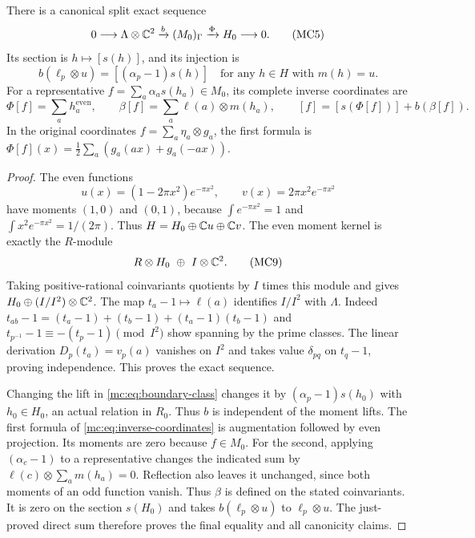 \begin{theorem}
\label{mc:thm:coinvariants}
There is a canonical split exact sequence
\[
 0\longrightarrow\Lambda\otimes\mathbb C^2
 \xrightarrow{b}(M_0)_\Gamma
 \xrightarrow{\Phi}H_0\longrightarrow0.
 \tag{MC5}\label{mc:eq:coinvariant-sequence}
\]
Its section is $h\mapsto[s(h)]$, and its injection is
\[
 b(\ell_p\otimes u)=[(\alpha_p-1)s(h)]
 \quad\text{for any }h\in H\text{ with }m(h)=u.
 \tag{MC6}\label{mc:eq:boundary-class}
\]
For a representative $f=\sum_a\alpha_as(h_a)\in M_0$, its
complete inverse coordinates are
\[
 \Phi[f]=\sum_a h_a^{\mathrm{even}},\qquad
 \beta[f]=\sum_a\ell(a)\otimes m(h_a),
 \qquad
 [f]=[s(\Phi[f])]+b(\beta[f]).
 \tag{MC7}\label{mc:eq:inverse-coordinates}
\]
In the original coordinates $f=\sum_a\eta_a\otimes g_a$,
the first formula is
$\Phi[f](x)=\tfrac12\sum_a(g_a(ax)+g_a(-ax))$.
\end{theorem}
\begin{proof}
The even functions
\[
 u(x)=(1-2\pi x^2)e^{-\pi x^2},\qquad
 v(x)=2\pi x^2e^{-\pi x^2}
 \tag{MC8}\label{mc:eq:moment-lifts}
\]
have moments $(1,0)$ and $(0,1)$, because
$\int e^{-\pi x^2}=1$ and $\int x^2e^{-\pi x^2}=1/(2\pi)$.
Thus $H=H_0\oplus\mathbb C u\oplus\mathbb C v$. The even moment kernel is
exactly the $R$-module
\[
 R\otimes H_0\ \oplus\ I\otimes\mathbb C^2.
 \tag{MC9}\label{mc:eq:moment-module}
\]
Taking positive-rational coinvariants quotients by $I$ times this
module and gives $H_0\oplus(I/I^2)\otimes\mathbb C^2$.
The map $t_a-1\mapsto\ell(a)$ identifies $I/I^2$ with
$\Lambda$. Indeed
$t_{ab}-1=(t_a-1)+(t_b-1)+(t_a-1)(t_b-1)$ and
$t_{p^{-1}}-1\equiv-(t_p-1)\pmod{I^2}$ show spanning by
the prime classes. The linear derivation $D_p(t_a)=v_p(a)$
vanishes on $I^2$ and takes value $\delta_{pq}$ on $t_q-1$,
proving independence. This proves the exact sequence.

Changing the lift in \eqref{mc:eq:boundary-class} changes it by
$(\alpha_p-1)s(h_0)$ with $h_0\in H_0$, an actual relation in
$R_0$. Thus $b$ is independent of the moment lifts.
The first formula of \eqref{mc:eq:inverse-coordinates} is augmentation
followed by even projection. Its moments are zero because $f\in M_0$.
For the second, applying $(\alpha_c-1)$ to a representative changes
the indicated sum by
$\ell(c)\otimes\sum_am(h_a)=0$. Reflection also leaves it
unchanged, since both moments of an odd function vanish. Thus
$\beta$ is defined on the stated coinvariants. It is zero on the
section $s(H_0)$ and takes $b(\ell_p\otimes u)$ to
$\ell_p\otimes u$. The just-proved direct sum therefore proves
the final equality and all canonicity claims.
\end{proof}

